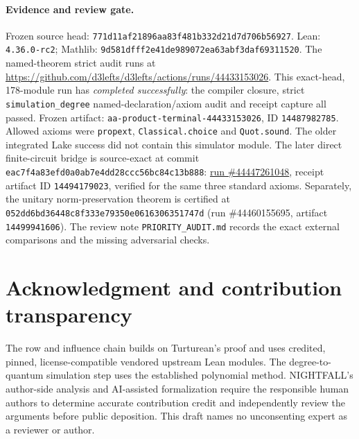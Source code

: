 \documentclass[11pt]{article}
\begin{document}
\paragraph{Evidence and review gate.}
Frozen source head: \texttt{771d11af21896aa83f481b332d21d7d706b56927}. Lean: \texttt{4.36.0-rc2}; Mathlib: \texttt{9d581dfff2e41de989072ea63abf3daf69311520}. The named-theorem strict audit runs at
\url{https://github.com/d3lefts/d3lefts/actions/runs/44433153026}.
This exact-head, 178-module run has \emph{completed successfully}: the compiler closure, strict \texttt{simulation\_degree} named-declaration/axiom audit and receipt capture all passed. Frozen artifact: \texttt{aa-product-terminal-44433153026}, ID \texttt{14487982785}. Allowed axioms were \texttt{propext}, \texttt{Classical.choice} and \texttt{Quot.sound}. The older integrated Lake success did not contain this simulator module. The later direct finite-circuit bridge is source-exact at commit \texttt{eac7f4a83efd0a0ab7e4dd28ccc56bc84c13b888}: \href{https://github.com/d3lefts/d3lefts/actions/runs/44447261048}{run \#44447261048}, receipt artifact ID \texttt{14494179023}, verified for the same three standard axioms. Separately, the unitary norm-preservation theorem is certified at \texttt{052dd6bd36448c8f333e79350e0616306351747d} (run \#44460155695, artifact \texttt{14499941606}). The review note \texttt{PRIORITY\_AUDIT.md} records the exact external comparisons and the missing adversarial checks.

\section*{Acknowledgment and contribution transparency}
The row and influence chain builds on Turturean's proof and uses credited, pinned, license-compatible vendored upstream Lean modules. The degree-to-quantum simulation step uses the established polynomial method. NIGHTFALL's author-side analysis and AI-assisted formalization require the responsible human authors to determine accurate contribution credit and independently review the arguments before public deposition. This draft names no unconsenting expert as a reviewer or author.
\end{document}
